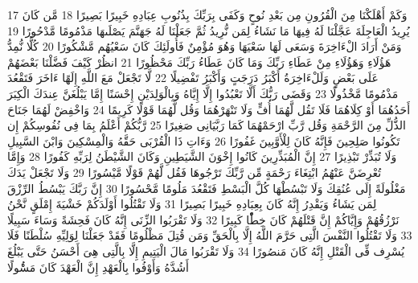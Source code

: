 \documentclass[20pt,a4paper]{article}
\begin{document}
{\tiny\colorbox{cl_aya}{17}} وَكَمْ أَهْلَكْنَا مِنَ الْقُرُونِ مِن بَعْدِ نُوحٍ وَكَفَى بِرَبِّكَ بِذُنُوبِ عِبَادِهِ خَبِيرًا بَصِيرًا
{\tiny\colorbox{cl_aya}{18}} مَّن كَانَ يُرِيدُ الْعَاجِلَةَ عَجَّلْنَا لَهُ فِيهَا مَا نَشَاءُ لِمَن نُّرِيدُ ثُمَّ جَعَلْنَا لَهُ جَهَنَّمَ يَصْلَىهَا مَذْمُومًا مَّدْحُورًا
{\tiny\colorbox{cl_aya}{19}} وَمَنْ أَرَادَ الْءَاخِرَةَ وَسَعَى لَهَا سَعْيَهَا وَهُوَ مُؤْمِنٌ فَأُولَئِكَ كَانَ سَعْيُهُم مَّشْكُورًا
{\tiny\colorbox{cl_aya}{20}} كُلًّا نُّمِدُّ هَؤُلَاءِ وَهَؤُلَاءِ مِنْ عَطَاءِ رَبِّكَ وَمَا كَانَ عَطَاءُ رَبِّكَ مَحْظُورًا
{\tiny\colorbox{cl_aya}{21}} انظُرْ كَيْفَ فَضَّلْنَا بَعْضَهُمْ عَلَى بَعْضٍ وَلَلْءَاخِرَةُ أَكْبَرُ دَرَجَتٍ وَأَكْبَرُ تَفْضِيلًا
{\tiny\colorbox{cl_aya}{22}} لَّا تَجْعَلْ مَعَ اللَّهِ إِلَهًا ءَاخَرَ فَتَقْعُدَ مَذْمُومًا مَّخْذُولًا
{\tiny\colorbox{cl_aya}{23}} وَقَضَى رَبُّكَ أَلَّا تَعْبُدُوا إِلَّا إِيَّاهُ وَبِالْوَلِدَيْنِ إِحْسَنًا إِمَّا يَبْلُغَنَّ عِندَكَ الْكِبَرَ أَحَدُهُمَا أَوْ كِلَاهُمَا فَلَا تَقُل لَّهُمَا أُفٍّ وَلَا تَنْهَرْهُمَا وَقُل لَّهُمَا قَوْلًا كَرِيمًا
{\tiny\colorbox{cl_aya}{24}} وَاخْفِضْ لَهُمَا جَنَاحَ الذُّلِّ مِنَ الرَّحْمَةِ وَقُل رَّبِّ ارْحَمْهُمَا كَمَا رَبَّيَانِى صَغِيرًا
{\tiny\colorbox{cl_aya}{25}} رَّبُّكُمْ أَعْلَمُ بِمَا فِى نُفُوسِكُمْ إِن تَكُونُوا صَلِحِينَ فَإِنَّهُ كَانَ لِلْأَوَّبِينَ غَفُورًا
{\tiny\colorbox{cl_aya}{26}} وَءَاتِ ذَا الْقُرْبَى حَقَّهُ وَالْمِسْكِينَ وَابْنَ السَّبِيلِ وَلَا تُبَذِّرْ تَبْذِيرًا
{\tiny\colorbox{cl_aya}{27}} إِنَّ الْمُبَذِّرِينَ كَانُوا إِخْوَنَ الشَّيَطِينِ وَكَانَ الشَّيْطَنُ لِرَبِّهِ كَفُورًا
{\tiny\colorbox{cl_aya}{28}} وَإِمَّا تُعْرِضَنَّ عَنْهُمُ ابْتِغَاءَ رَحْمَةٍ مِّن رَّبِّكَ تَرْجُوهَا فَقُل لَّهُمْ قَوْلًا مَّيْسُورًا
{\tiny\colorbox{cl_aya}{29}} وَلَا تَجْعَلْ يَدَكَ مَغْلُولَةً إِلَى عُنُقِكَ وَلَا تَبْسُطْهَا كُلَّ الْبَسْطِ فَتَقْعُدَ مَلُومًا مَّحْسُورًا
{\tiny\colorbox{cl_aya}{30}} إِنَّ رَبَّكَ يَبْسُطُ الرِّزْقَ لِمَن يَشَاءُ وَيَقْدِرُ إِنَّهُ كَانَ بِعِبَادِهِ خَبِيرًا بَصِيرًا
{\tiny\colorbox{cl_aya}{31}} وَلَا تَقْتُلُوا أَوْلَدَكُمْ خَشْيَةَ إِمْلَقٍ نَّحْنُ نَرْزُقُهُمْ وَإِيَّاكُمْ إِنَّ قَتْلَهُمْ كَانَ خِطًْٔا كَبِيرًا
{\tiny\colorbox{cl_aya}{32}} وَلَا تَقْرَبُوا الزِّنَى إِنَّهُ كَانَ فَحِشَةً وَسَاءَ سَبِيلًا
{\tiny\colorbox{cl_aya}{33}} وَلَا تَقْتُلُوا النَّفْسَ الَّتِى حَرَّمَ اللَّهُ إِلَّا بِالْحَقِّ وَمَن قُتِلَ مَظْلُومًا فَقَدْ جَعَلْنَا لِوَلِيِّهِ سُلْطَنًا فَلَا يُسْرِف فِّى الْقَتْلِ إِنَّهُ كَانَ مَنصُورًا
{\tiny\colorbox{cl_aya}{34}} وَلَا تَقْرَبُوا مَالَ الْيَتِيمِ إِلَّا بِالَّتِى هِىَ أَحْسَنُ حَتَّى يَبْلُغَ أَشُدَّهُ وَأَوْفُوا بِالْعَهْدِ إِنَّ الْعَهْدَ كَانَ مَسُْٔولًا
\end{document}
